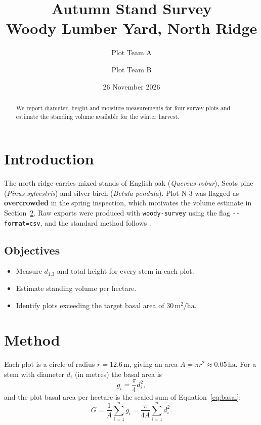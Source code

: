 \documentclass[11pt, a4paper]{article}
\title{Autumn Stand Survey\\\large Woody Lumber Yard, North Ridge}
\author{Plot Team A \and Plot Team B}
\date{26 November 2026}
\newcommand{\unit}[1]{\,\mathrm{#1}}
\newcommand{\species}[2]{#1 (\emph{#2})}
\newcommand{\dbh}{\ensuremath{d_{1.3}}}
\begin{document}
\maketitle

\begin{abstract}
We report diameter, height and moisture measurements for four survey plots and estimate the standing volume available for the winter harvest.
\end{abstract}

\section{Introduction}
\label{sec:intro}

The north ridge carries mixed stands of \species{English oak}{Quercus robur}, \species{Scots pine}{Pinus sylvestris} and \species{silver birch}{Betula pendula}. Plot N-3 was flagged as \textbf{overcrowded} in the spring inspection, which motivates the volume estimate in Section~\ref{sec:method}. Raw exports were produced with \texttt{woody-survey} using the flag \verb|--format=csv|, and the standard method follows \cite{forest-mensuration}.

\subsection{Objectives}

\begin{itemize}
  \item Measure \dbh{} and total height for every stem in each plot.
  \item Estimate standing volume per hectare.
  \item Identify plots exceeding the target basal area of $30\unit{m^2/ha}$.
\end{itemize}

\section{Method}
\label{sec:method}

Each plot is a circle of radius $r = 12.6\unit{m}$, giving an area $A = \pi r^2 \approx 0.05\unit{ha}$. For a stem with diameter $d_i$ (in metres) the basal area is
\begin{equation}
  g_i = \frac{\pi}{4} d_i^{2},
  \label{eq:basal}
\end{equation}
and the plot basal area per hectare is the scaled sum of Equation~\eqref{eq:basal}:
\begin{equation}
  G = \frac{1}{A} \sum_{i=1}^{n} g_i = \frac{\pi}{4A} \sum_{i=1}^{n} d_i^{2}.
  \label{eq:plot-basal}
\end{equation}
\end{document}
